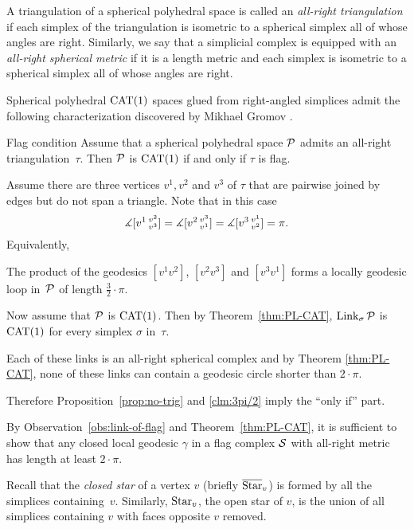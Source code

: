 A triangulation of a spherical polyhedral space 
is called an  \emph{all-right triangulation} 
if each simplex of the triangulation is isometric 
to a spherical simplex all of whose angles are right.
Similarly, we say that a simplicial complex 
is equipped with an  \emph{all-right spherical metric}
if it is a length metric and each simplex is isometric 
to a spherical simplex all of whose angles are right.

Spherical polyhedral $\mathrm{CAT}(1)$ spaces glued from right-angled simplices
admit the following characterization 
discovered by Mikhael Gromov \cite[p.~122]{gromov-1987}.

\begin{thm}{Flag condition}\label{thm:flag}
Assume that a spherical polyhedral space $\mathcal{P}$
admits an all-right triangulation~$\tau$.
Then $\mathcal{P}$ is $\mathrm{CAT}(1)$
if and only if $\tau$ is flag.
\end{thm}

Assume there are three vertices $v^1,v^2$ and $v^3$ of $\tau$
that are pairwise joined by edges 
but do not span a triangle.
Note that in this case 
\[
\measuredangle[v^1\,{}^{v^2}_{v^3}]=
\measuredangle[v^2\,{}^{v^3}_{v^1}]=
\measuredangle[v^3\,{}^{v^1}_{v^2}]=
\pi.
\]
Equivalently,
\begin{clm}{}\label{clm:3pi/2}
The product
of the geodesics $[v^1v^2]$, $[v^2v^3]$ and $[v^3v^1]$
forms a locally geodesic loop in~$\mathcal{P}$ of length $\tfrac32\cdot\pi$.
\end{clm}

Now assume that $\mathcal{P}$ is $\mathrm{CAT}(1)$.
Then by Theorem~\ref{thm:PL-CAT},
$\mathop{\rm Link}\nolimits_\sigma\mathcal{P}$ is $\mathrm{CAT}(1)$ for every simplex $\sigma$ 
in~$\tau$. 

Each of these links is an all-right spherical complex and by Theorem \ref{thm:PL-CAT}, none of these links can contain a geodesic circle shorter than $2\cdot\pi$. 

Therefore Proposition~\ref{prop:no-trig} and \ref{clm:3pi/2} 
imply the ``only if'' part.

By Observation~\ref{obs:link-of-flag} and Theorem~\ref{thm:PL-CAT},
it is sufficient to show that any closed local geodesic $\gamma$ 
in a flag complex $\mathcal{S}$ with all-right metric has length at least $2\cdot\pi$.

Recall that the  \emph{closed star} of a vertex $v$ (briefly $\overline {\mathop{\rm Star}\nolimits}_v$)
is formed by all the simplices containing~$v$. 
Similarly, $\mathop{\rm Star}\nolimits_v$, the open star of $v$, is the union of all simplices containing $v$ with faces opposite $v$ removed.

